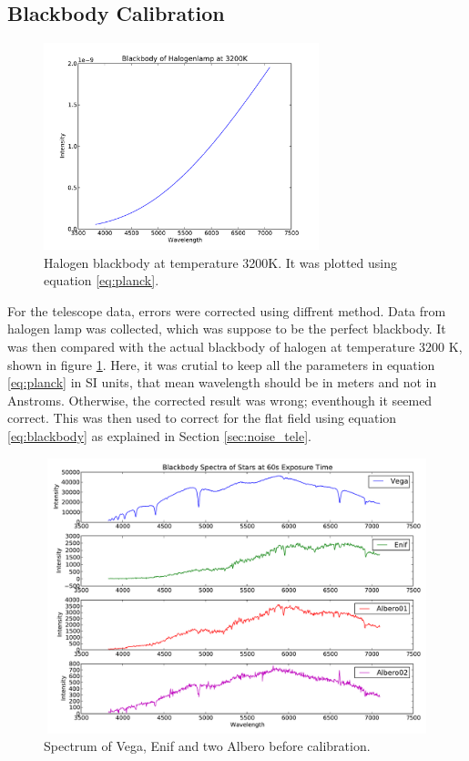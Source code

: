 \documentclass[a4paper,12pt]{article}
\begin{document}
\subsection{Blackbody Calibration} 
\label{sec:bc}

\begin{figure}[H]
\centering
\includegraphics[angle=0,height=6cm,width=8cm]{graphs/Blackbody.pdf}
\caption{Halogen blackbody at temperature 3200K. It was plotted using equation \ref{eq:planck}.}
\label{fig:bb}
\end{figure}
For the telescope data, errors were corrected using diffrent method. Data from halogen lamp was collected, which was suppose to be the perfect blackbody. It was then compared with the actual blackbody of halogen at temperature 3200 K, shown in figure \ref{fig:bb}. Here, it was crutial to keep all the parameters in equation \ref{eq:planck} in SI units, that mean wavelength should be in meters and not in Anstroms. Otherwise, the corrected result was wrong; eventhough it seemed correct. This was then used to correct for the flat field using equation \ref{eq:blackbody} as explained in Section \ref{sec:noise_tele}.
\begin{figure}[H]
\centering
\includegraphics[angle=0,height=8cm,width=12cm]{graphs/Starwithout.pdf}
\caption{Spectrum of Vega, Enif and two Albero before calibration.}
\label{fig:starwithout}
\end{figure}
\end{document}
